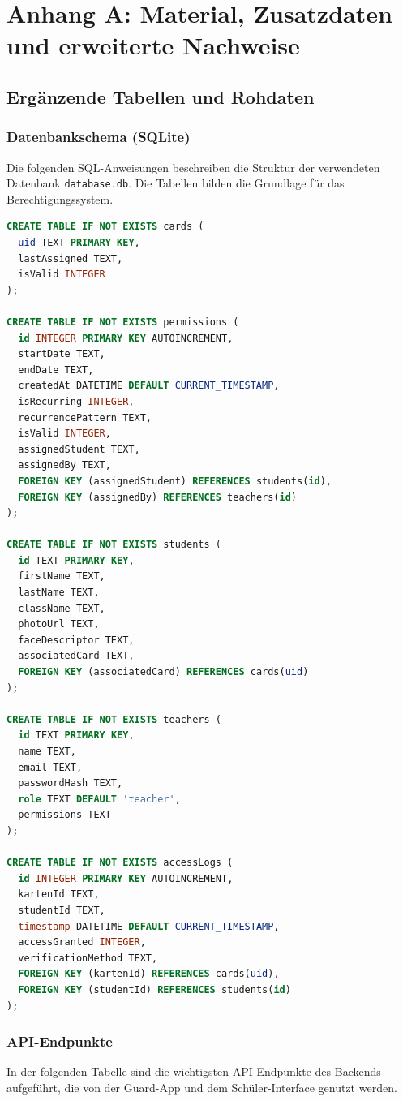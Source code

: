 \section{Anhang A: Material, Zusatzdaten und erweiterte Nachweise}\label{sec:anhanga}

\subsection{Ergänzende Tabellen und Rohdaten}

\subsubsection{Datenbankschema (SQLite)}
Die folgenden SQL-Anweisungen beschreiben die Struktur der verwendeten Datenbank \texttt{database.db}. Die Tabellen bilden die Grundlage für das Berechtigungssystem.

\begin{lstlisting}[language=SQL]
CREATE TABLE IF NOT EXISTS cards (
  uid TEXT PRIMARY KEY,
  lastAssigned TEXT,
  isValid INTEGER
);

CREATE TABLE IF NOT EXISTS permissions (
  id INTEGER PRIMARY KEY AUTOINCREMENT,
  startDate TEXT,
  endDate TEXT,
  createdAt DATETIME DEFAULT CURRENT_TIMESTAMP,
  isRecurring INTEGER,
  recurrencePattern TEXT,
  isValid INTEGER,
  assignedStudent TEXT,
  assignedBy TEXT,
  FOREIGN KEY (assignedStudent) REFERENCES students(id),
  FOREIGN KEY (assignedBy) REFERENCES teachers(id)
);

CREATE TABLE IF NOT EXISTS students (
  id TEXT PRIMARY KEY,
  firstName TEXT,
  lastName TEXT,
  className TEXT,
  photoUrl TEXT,
  faceDescriptor TEXT,
  associatedCard TEXT,
  FOREIGN KEY (associatedCard) REFERENCES cards(uid)
);

CREATE TABLE IF NOT EXISTS teachers (
  id TEXT PRIMARY KEY,
  name TEXT,
  email TEXT,
  passwordHash TEXT,
  role TEXT DEFAULT 'teacher',
  permissions TEXT
);

CREATE TABLE IF NOT EXISTS accessLogs (
  id INTEGER PRIMARY KEY AUTOINCREMENT,
  kartenId TEXT,
  studentId TEXT,
  timestamp DATETIME DEFAULT CURRENT_TIMESTAMP,
  accessGranted INTEGER,
  verificationMethod TEXT,
  FOREIGN KEY (kartenId) REFERENCES cards(uid),
  FOREIGN KEY (studentId) REFERENCES students(id)
);
\end{lstlisting}

\subsubsection{API-Endpunkte}
In der folgenden Tabelle sind die wichtigsten API-Endpunkte des Backends aufgeführt, die von der Guard-App und dem Schüler-Interface genutzt werden.


